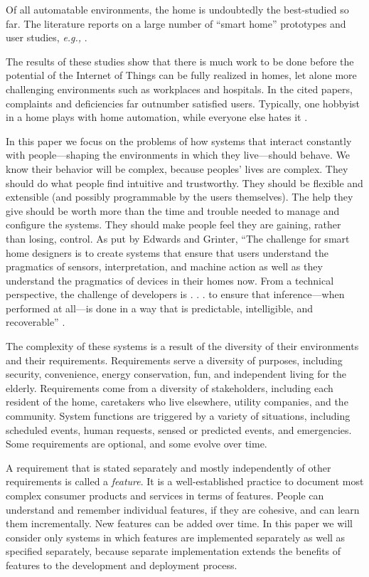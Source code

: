 \documentclass[conference]{IEEEtran}
\begin{document}
Of all automatable environments, the home is undoubtedly the best-studied
so far.
The literature reports on a large number of ``smart home'' prototypes
and user studies, {\it e.g.,} 
\cite{aipperspach,microsoftUS,homecontrol,7challenges,homey,sabbathday}.

The results of these studies show that there is much work to be done before
the potential of the Internet of Things can be fully realized in homes,
let alone more challenging environments such as workplaces and hospitals.
In the cited papers, complaints and deficiencies far outnumber 
satisfied users.  
Typically, one hobbyist in a home plays with home automation, while
everyone else hates it \cite{homey}.

In this paper we focus on the problems of how
systems that interact constantly with people---shaping
the environments in which they live---should behave.
We know their behavior will be complex, because peoples' lives are complex.
They should do what people find intuitive and trustworthy.
They should be flexible and extensible (and possibly programmable
by the users themselves).
The help they give should be worth more than the time and trouble needed
to manage and configure the systems.
They should make 
people feel they are gaining, rather than losing, control.
As put by Edwards and Grinter,
``The challenge for smart home designers is to create systems that ensure
that users understand the pragmatics of sensors, interpretation, and
machine action as well as they understand the pragmatics of devices in
their homes now. 
From a technical perspective, the challenge of developers is . . .
to ensure that inference---when performed
at all---is done in a way that is predictable, intelligible, and 
recoverable'' \cite{7challenges}.

The complexity of these systems is a result of the diversity of their
environments and their requirements.
Requirements serve a diversity of purposes, including security,
convenience, energy conservation, fun, and independent living for the
elderly.
Requirements come from a diversity of stakeholders, including each
resident of the home, caretakers who live elsewhere, 
utility companies, and the community.
System functions are triggered by a variety of situations, including
scheduled events, human requests, sensed or predicted events, and
emergencies.
Some requirements are optional, and some evolve over time.

A requirement that is stated separately and mostly independently of
other requirements is called a {\it feature}.
It is a well-established practice to document most complex
consumer products and services in terms of features.
People can understand and remember individual features, if
they are cohesive, and can learn them incrementally.
New features can be added over time.
In this paper we will consider only systems in which features are
implemented separately as well as specified separately, because 
separate implementation extends the benefits of features to the
development and deployment process.
\end{document}
